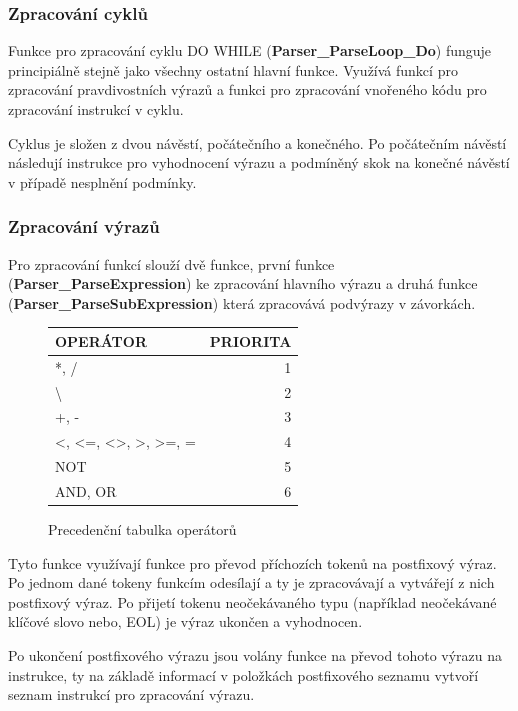 \documentclass[a4paper,11pt]{article}
\begin{document}
\subsubsection{Zpracování cyklů} \label{syse-reseni-cykly}
Funkce pro zpracování cyklu \textsf{DO WHILE} (\textbf{Parser\_ParseLoop\_Do}) funguje principiálně stejně jako všechny ostatní hlavní funkce. Využívá funkcí pro zpracování pravdivostních výrazů a funkci pro zpracování vnořeného kódu pro zpracování instrukcí v cyklu.

\vspace{2mm}
Cyklus je složen z dvou návěstí, počátečního a konečného. Po počátečním návěstí následují instrukce pro vyhodnocení výrazu a podmíněný skok na konečné návěstí v případě nesplnění podmínky.

\subsubsection{Zpracování výrazů} \label{syse-reseni-vyrazy}
Pro zpracování funkcí slouží dvě funkce, první funkce (\textbf{Parser\_ParseExpression}) ke zpracování hlavního výrazu a druhá funkce (\textbf{Parser\_ParseSubExpression}) která zpracovává podvýrazy v závorkách.

\begin{figure}
	\centering
	\renewcommand{\arraystretch}{1.3}
	\begin{tabular}{ l r }
		OPERÁTOR					& PRIORITA 	\\ \hline\hline
		*, /						& 1			\\ \hline
		\textbackslash				& 2			\\ \hline
		+, -						& 3			\\ \hline
		<, <=, <>, >, >=, =			& 4			\\ \hline
		\textsc{NOT}				& 5			\\ \hline
		\textsc{AND}, \textsc{OR}	& 6			\\ \hline
	\end{tabular}
	
	\caption{Precedenční tabulka operátorů}
	\label{fig:precedence_table}
\end{figure}

Tyto funkce využívají funkce pro převod příchozích tokenů na postfixový výraz. Po jednom dané tokeny funkcím odesílají a ty je zpracovávají a vytvářejí z nich postfixový výraz. Po přijetí tokenu neočekávaného typu (například neočekávané klíčové slovo nebo, \textsf{EOL}) je výraz ukončen a vyhodnocen.

\vspace{2mm}
Po ukončení postfixového výrazu jsou volány funkce na převod tohoto výrazu na instrukce, ty na základě informací v položkách postfixového seznamu vytvoří seznam instrukcí pro zpracování výrazu.
\end{document}
